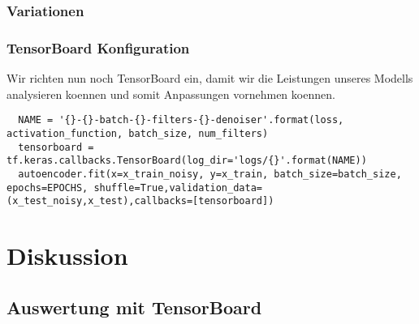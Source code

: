 \subsection{Variationen}

\subsection{TensorBoard Konfiguration}
Wir richten nun noch TensorBoard ein, damit wir die Leistungen unseres Modells
analysieren koennen und somit Anpassungen vornehmen koennen.
\begin{verbatim}
  NAME = '{}-{}-batch-{}-filters-{}-denoiser'.format(loss, activation_function, batch_size, num_filters)
  tensorboard = tf.keras.callbacks.TensorBoard(log_dir='logs/{}'.format(NAME))
  autoencoder.fit(x=x_train_noisy, y=x_train, batch_size=batch_size, epochs=EPOCHS, shuffle=True,validation_data=(x_test_noisy,x_test),callbacks=[tensorboard])
\end{verbatim}

\chapter{Diskussion}
\section{Auswertung mit TensorBoard}


